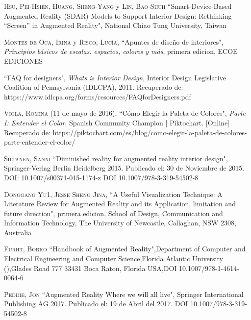 \begin{thebibliography}{X}
	
	 \textsc{Hsu, Pei-Hsien}, \textsc{Huang, Sheng-Yang} y \textsc{Lin, Bao-Shuh} ``Smart-Device-Based Augmented Reality (SDAR) Models to Support Interior Design: Rethinking ``Screen” in Augmented Reality", National Chiao Tung University, Taiwan
	
	 \textsc{Montes de Oca, Irina} y \textsc{Risco, Lucía},
	``Apuntes de diseño de interiores",
	\textit{Principios básicos de escalas. espacios, colores y más}, primera edicion,
	ECOE EDICIONES
	
	 ``FAQ for designers", \textit{Whats is Interior Design}, Interior Design Legislative Coalition of Pennsylvania (IDLCPA), 2011. Recuperado de: https://www.idlcpa.org/forms/resources/FAQforDesigners.pdf
	
	
	
		
	 \textsc{Viola, Romina} (11 de mayo de 2016), ``Cómo Elegir la Paleta de Colores", \textit{Parte I: Entender el Color}. Spanish Community Champion | Piktochart. [Online] Recuperado de: https://piktochart.com/es/blog/como-elegir-la-paleta-de-colores-parte-entender-el-color/
	
	
	
	 \textsc{Siltanen, Sanni} ``Diminished reality for augmented reality interior design", Springer-Verlag Berlin Heidelberg 2015. Publicado el: 30 de Noviembre de 2015. DOI: 10.1007/s00371-015-1174-z
	DOI 10.1007/978-3-319-54502-8
	
	 \textsc{Donggang Yu1, Jesse Sheng Jina},
	``A Useful Visualization Technique: A Literature Review for Augmented Reality and its Application, limitation and future direction", primera edicion,
	School of Design, Communication and Information Technology, The University of Newcastle, Callaghan, NSW 2308, Australia
	
	
	
	 \textsc{Furht, Borko} ``Handbook of Augmented Reality",Department of Computer and Electrical Engineering and Computer Science,Florida Atlantic University (),Glades Road 777 33431 Boca Raton, Florida USA,DOI 10.1007/978-1-4614-0064-6
	
	 \textsc{Peddie, Jon} ``Augmented Reality Where we will all live", Springer International Publishing AG 2017. Publicado el: 19 de Abril del 2017. DOI 10.1007/978-3-319-54502-8 
	

\end{thebibliography}
